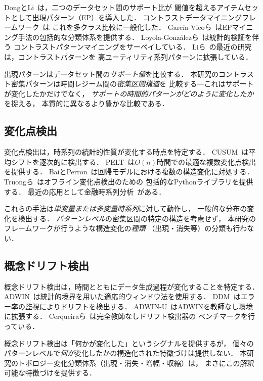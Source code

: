 DongとLi~\cite{dong1999emerging}は，二つのデータセット間のサポート比が
閾値を超えるアイテムセットとして出現パターン（EP）を導入した．
コントラストデータマイニングフレームワーク~\cite{dong2012contrast}は
これを多クラス比較に一般化した．
Garc\'ia-Vicoら~\cite{garciavico2018ep}はEPマイニング手法の包括的な分類体系を提供する．
Loyola-Gonz\'alezら~\cite{loyola2020contrast}は統計的検証を伴う
コントラストパターンマイニングをサーベイしている．
Liら~\cite{li2025hucspm}の最近の研究は，コントラストパターンを
高ユーティリティ系列パターンに拡張している．

出現パターンはデータセット間の\emph{サポート値}を比較する．
本研究のコントラスト密集パターンは時間レジーム間の\emph{密集区間構造}を
比較する---これはサポートが変化したかだけでなく，
\emph{サポートの時間的パターンがどのように変化したか}を捉える，
本質的に異なるより豊かな比較である．

\subsection{変化点検出}

変化点検出は，時系列の統計的性質が変化する時点を特定する．
CUSUM~\cite{page1954cusum}は平均シフトを逐次的に検出する．
PELT~\cite{killick2012pelt}は$O(n)$時間での最適な複数変化点検出を提供する．
BaiとPerron~\cite{bai2003structural}は回帰モデルにおける複数の構造変化に対処する．
Truongら~\cite{truong2020ruptures}はオフライン変化点検出のための
包括的なPythonライブラリを提供する．
最近の応用として金融時系列分析~\cite{chen2025pelt}がある．

これらの手法は\emph{単変量または多変量時系列}に対して動作し，
一般的な分布の変化を検出する．
\emph{パターンレベル}の密集区間の特定の構造を考慮せず，
本研究のフレームワークが行うような構造変化の\emph{種類}
（出現・消失等）の分類も行わない．

\subsection{概念ドリフト検出}

概念ドリフト検出は，時間とともにデータ生成過程が変化することを特定する．
ADWIN~\cite{bifet2007adwin}は統計的境界を用いた適応的ウィンドウ法を使用する．
DDM~\cite{gama2004ddm}はエラー率の監視によりドリフトを検出する．
ADWIN-U~\cite{assis2024adwinu}はADWINを教師なし環境に拡張する．
Cerqueiraら~\cite{cerqueira2024benchmark}は完全教師なしドリフト検出器の
ベンチマークを行っている．

概念ドリフト検出は「何かが変化した」というシグナルを提供するが，
個々のパターンレベルで\emph{何が}変化したかの構造化された特徴づけは提供しない．
本研究のトポロジー変化分類体系（出現・消失・増幅・収縮）は，
まさにこの解釈可能な特徴づけを提供する．

